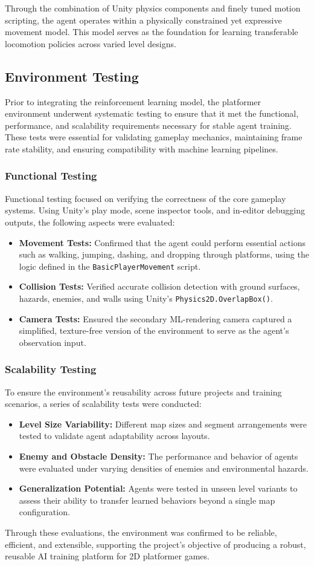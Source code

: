\documentclass[12pt,oneside,openright,a4paper]{cpe-english-project}
\begin{document}
Through the combination of Unity physics components and finely tuned motion scripting, the agent operates within a physically constrained yet expressive movement model. This model serves as the foundation for learning transferable locomotion policies across varied level designs.

\subsection{Environment Testing}
Prior to integrating the reinforcement learning model, the platformer environment underwent systematic testing to ensure that it met the functional, performance, and scalability requirements necessary for stable agent training. These tests were essential for validating gameplay mechanics, maintaining frame rate stability, and ensuring compatibility with machine learning pipelines.
\subsubsection{Functional Testing}
Functional testing focused on verifying the correctness of the core gameplay systems. Using Unity’s play mode, scene inspector tools, and in-editor debugging outputs, the following aspects were evaluated:
\begin{itemize}
\item  \textbf{Movement Tests:} Confirmed that the agent could perform essential actions such as walking, jumping, dashing, and dropping through platforms, using the logic defined in the \texttt{BasicPlayerMovement} script.
\item  \textbf{Collision Tests:} Verified accurate collision detection with ground surfaces, hazards, enemies, and walls using Unity’s \texttt{Physics2D.OverlapBox()}.
\item  \textbf{Camera Tests:} Ensured the secondary ML-rendering camera captured a simplified, texture-free version of the environment to serve as the agent’s observation input.
\end{itemize}
\subsubsection{Scalability Testing}
To ensure the environment’s reusability across future projects and training scenarios, a series of scalability tests were conducted:
\begin{itemize}
\item  \textbf{Level Size Variability:} Different map sizes and segment arrangements were tested to validate agent adaptability across layouts.
\item  \textbf{Enemy and Obstacle Density:} The performance and behavior of agents were evaluated under varying densities of enemies and environmental hazards.
\item  \textbf{Generalization Potential:} Agents were tested in unseen level variants to assess their ability to transfer learned behaviors beyond a single map configuration.
\end{itemize}
Through these evaluations, the environment was confirmed to be reliable, efficient, and extensible, supporting the project’s objective of producing a robust, reusable AI training platform for 2D platformer games.
\end{document}
